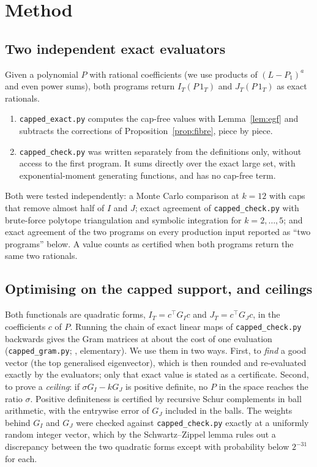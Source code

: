 \section{Method}

\subsection*{Two independent exact evaluators}
Given a polynomial $P$ with rational coefficients (we use products of
$(L-P_1)^a$ and even power sums), both programs return $I_T(P\,1_T)$ and
$J_T(P\,1_T)$ as exact rationals.
\begin{enumerate}
\item \texttt{capped\_exact.py} computes the cap-free values with
Lemma~\ref{lem:egf} and subtracts the corrections of
Proposition~\ref{prop:fibre}, piece by piece.
\item \texttt{capped\_check.py} was written separately from the definitions
only, without access to the first program. It sums directly over the exact
large set, with exponential-moment generating functions, and has no cap-free
term.
\end{enumerate}
Both were tested independently: a Monte Carlo comparison at $k=12$ with caps
that remove almost half of $I$ and $J$; exact agreement of
\texttt{capped\_check.py} with brute-force polytope triangulation and symbolic
integration for $k=2,\dots,5$; and exact agreement of the two programs on every
production input reported as ``two programs'' below. A value counts as
certified when both programs return the same two rationals.

\subsection*{Optimising on the capped support, and ceilings}
Both functionals are quadratic forms, $I_T=c^\top G_Ic$ and $J_T=c^\top G_Jc$,
in the coefficients $c$ of $P$. Running the chain of exact linear maps of
\texttt{capped\_check.py} backwards gives the Gram matrices at about the cost
of one evaluation (\texttt{capped\_gram.py}; , elementary).
We use them in two ways. First, to \emph{find} a good vector (the top
generalised eigenvector), which is then rounded and re-evaluated exactly by
the evaluators; only that exact value is stated as a certificate. Second, to
prove a \emph{ceiling}: if $\sigma G_I-kG_J$ is positive definite, no $P$ in
the space reaches the ratio $\sigma$. Positive definiteness is certified by
recursive Schur complements in ball arithmetic, with the entrywise error of
$G_J$ included in the balls. The weights behind $G_I$ and $G_J$ were checked
against \texttt{capped\_check.py} exactly at a uniformly random integer
vector, which by the Schwartz--Zippel lemma rules out a discrepancy between
the two quadratic forms except with probability below $2^{-31}$ for each.

